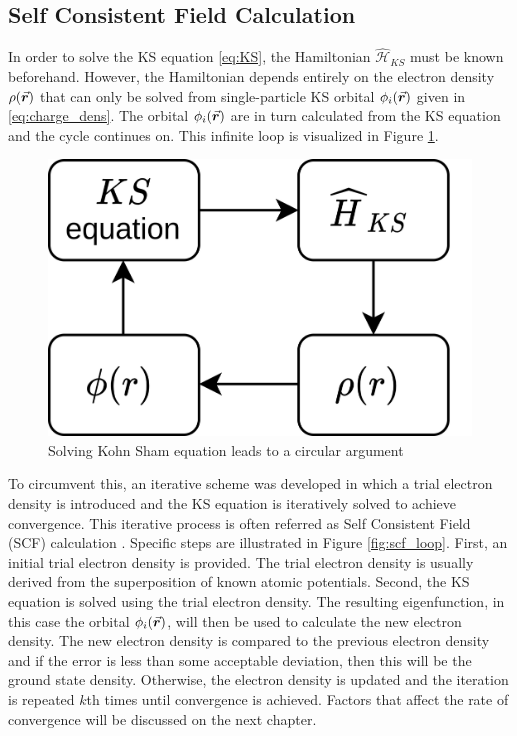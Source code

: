 \subsection{Self Consistent Field Calculation} \label{sec:scf}
In order to solve the KS equation \eqref{eq:KS}, the Hamiltonian $\hat{\mathcal{H}}_{KS}$ must be known beforehand. However, the Hamiltonian depends entirely  on the electron density $\rho({\va*{r}})$ that can only be  solved from single-particle KS orbital $\phi_i(\va*{r})$ given in \eqref{eq:charge_dens}. The orbital $\phi_i(\va*{r})$ are in turn calculated from the KS equation and the cycle continues on. This infinite loop is visualized in Figure \ref{fig:KS_loop}.

\begin{figure}[tbh!]
	\centering
	\includegraphics[width=0.3\linewidth]{"images/theory/KS_loop"}
	\caption[Kohn-Sham loop]{Solving Kohn Sham equation leads to a circular argument}
	\label{fig:KS_loop}
\end{figure}

To circumvent this, an iterative scheme was developed  in which a trial electron density is introduced and the KS equation is iteratively solved  to achieve convergence. This iterative process is often referred as Self Consistent Field (SCF) calculation \citep{Woods2019}. Specific steps are illustrated in Figure \ref{fig:scf_loop}. First, an initial trial electron density is provided. The trial electron density is usually derived from the superposition of known atomic potentials. Second,    the KS equation is solved using the trial electron density. The resulting eigenfunction, in this case the orbital $\phi_i(\va*{r})$, will then be used to calculate the new electron density. The new electron density is compared to the previous electron density and if the error is less than some acceptable deviation, then this will be the ground state density. Otherwise, the electron density is updated and the iteration is repeated $k$th times until convergence is achieved. Factors that affect the rate of convergence will be discussed on the next chapter.

